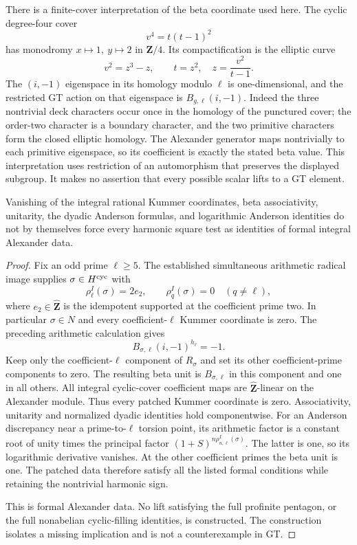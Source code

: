 There is a finite-cover interpretation of the beta
coordinate used here. The cyclic degree-four cover
\[
                 v^4=t(t-1)^2
\]
has monodromy \(x\mapsto1,\ y\mapsto2\) in
\(\mathbf Z/4\). Its compactification is the elliptic curve
\[
             v^2=z^3-z,\qquad t=z^2,\quad
             z=\frac{v^2}{t-1}.
\]
The \((i,-1)\) eigenspace in its homology modulo \(\ell\)
is one-dimensional, and the restricted GT action
on that eigenspace is \(B_{g,\ell}(i,-1)\).
Indeed the three nontrivial deck characters occur once in
the homology of the punctured cover; the order-two character
is a boundary character, and the two primitive characters
form the closed elliptic homology. The Alexander generator
maps nontrivially to each primitive eigenspace, so its
coefficient is exactly the stated beta value.
This interpretation uses restriction of an automorphism
that preserves the displayed subgroup. It makes no
assertion that every possible scalar lifts to a GT element.

\begin{proposition}\label{prop:harmonic-formal-residue-gap}
Vanishing of the integral rational Kummer coordinates,
beta associativity, unitarity, the dyadic Anderson formulas,
and logarithmic Anderson identities do not by themselves
force every harmonic square test as identities of formal
integral Alexander data.
\end{proposition}
\begin{proof}
Fix an odd prime \(\ell\ge5\). The established simultaneous
arithmetic radical image supplies
\(\sigma\in H^{\rm cyc}\) with
\[
 \rho_\ell^I(\sigma)=2e_2,\qquad
 \rho_q^I(\sigma)=0\quad(q\ne\ell),
\]
where \(e_2\in\widehat{\mathbf Z}\) is the idempotent
supported at the coefficient prime two. In particular
\(\sigma\in N\) and every coefficient-\(\ell\) Kummer
coordinate is zero. The preceding arithmetic calculation
gives
\[
              B_{\sigma,\ell}(i,-1)^{h_\ell}=-1.
\]
Keep only the coefficient-\(\ell\) component of
\(R_\sigma\) and set its other coefficient-prime components
to zero. The resulting beta unit is \(B_{\sigma,\ell}\)
in this component and one in all others.
All integral cyclic-cover coefficient maps are
\(\widehat{\mathbf Z}\)-linear on the Alexander module.
Thus every patched Kummer coordinate is zero.
Associativity, unitarity and normalized dyadic identities
hold componentwise. For an Anderson discrepancy near a
prime-to-\(\ell\) torsion point, its arithmetic factor is
a constant root of unity times the principal factor
\((1+S)^{n\rho_{n,\ell}^I(\sigma)}\).
The latter is one, so its logarithmic derivative vanishes.
At the other coefficient primes the beta unit is one.
The patched data therefore satisfy all the listed formal
conditions while retaining the nontrivial harmonic sign.

This is formal Alexander data. No lift satisfying the full
profinite pentagon, or the full nonabelian cyclic-filling
identities, is constructed. The construction isolates a
missing implication and is not a counterexample in GT.
\end{proof}
